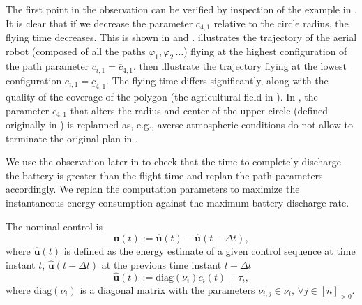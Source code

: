 The first point in the observation can be verified by inspection of the example in . It is clear that if we decrease the parameter $c_{4,1}$ relative to the circle radius, the flying time decreases. This is shown in  and .  illustrates the trajectory of the aerial robot (composed of all the paths $\varphi_1,\varphi_2\,\dots$) flying at the highest configuration of the path parameter $c_{i,1}=\overline{c}_{4,1}$.  then illustrate the trajectory flying at the lowest configuration $c_{i,1}=\underline{c}_{4,1}$. The flying time differs significantly, along with the quality of the coverage of the polygon (the agricultural field in ). In , the parameter $c_{4,1}$ that alters the radius and center of the upper circle (defined originally in ) is replanned as, e.g., averse atmospheric conditions do not allow to terminate the original plan in .

We use the observation later in  to check that the time to completely discharge the battery is greater than the flight time and replan the path parameters accordingly.  We replan the computation parameters to maximize the instantaneous energy consumption against the maximum battery discharge rate.

The nominal control is
\begin{equation}\label{eq:state-control}
  \mathbf{u}(t):=\hat{\mathbf{u}}(t)-\hat{\mathbf{u}}(t-\Delta t),
\end{equation}
where $\hat{\mathbf{u}}(t)$ is defined as the energy estimate of a given control sequence at time instant $t$, $\hat{\mathbf{u}}(t-\Delta t)$ at the previous time instant $t-\Delta t$
\begin{equation}\label{eq:estimate-control}
  \hat{\mathbf{u}}(t):=\mathrm{diag}(\nu_i)c_i(t)+\tau_i,
\end{equation}
where $\mathrm{diag}(\nu_i)$ is a diagonal matrix with the parameters
$\nu_{i,j}\in\nu_i,\,\forall j\in[n]_{>0}$.

